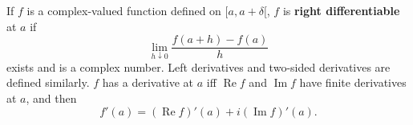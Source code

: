 If $f$ is a complex-valued function defined on $[a, a+\delta[$, $f$ is \textbf{right differentiable} at $a$ if
$$\lim_{h \downarrow 0} \frac{f(a+h) - f(a)}{h}$$
exists and is a complex number. Left derivatives and two-sided derivatives are defined similarly. $f$ has a derivative at $a$ iff $\operatorname{Re} f$ and $\operatorname{Im} f$ have finite derivatives at $a$, and then
$$f'(a) = (\operatorname{Re} f)'(a) + i (\operatorname{Im} f)'(a).$$
